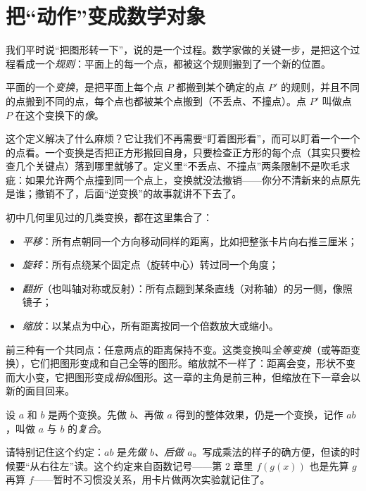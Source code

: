 \section{把“动作”变成数学对象}

我们平时说“把图形转一下”，说的是一个过程。数学家做的关键一步，是把这个过程看成一个\emph{规则}：平面上的每一个点，都被这个规则搬到了一个新的位置。

\begin{dingyi}[变换]
平面的一个\emph{变换}，是把平面上每个点 $P$ 都搬到某个确定的点 $P'$ 的规则，并且不同的点搬到不同的点，每个点也都被某个点搬到（不丢点、不撞点）。点 $P'$ 叫做点 $P$ 在这个变换下的\emph{像}。
\end{dingyi}

这个定义解决了什么麻烦？它让我们不再需要“盯着图形看”，而可以盯着一个一个的点看。一个变换是否把正方形搬回自身，只要检查正方形的每个点（其实只要检查几个关键点）落到哪里就够了。定义里“不丢点、不撞点”两条限制不是吹毛求疵：如果允许两个点撞到同一个点上，变换就没法撤销——你分不清新来的点原先是谁；撤销不了，后面“逆变换”的故事就讲不下去了。

初中几何里见过的几类变换，都在这里集合了：

\begin{itemize}
  \item \emph{平移}：所有点朝同一个方向移动同样的距离，比如把整张卡片向右推三厘米；
  \item \emph{旋转}：所有点绕某个固定点（旋转中心）转过同一个角度；
  \item \emph{翻折}（也叫轴对称或反射）：所有点翻到某条直线（对称轴）的另一侧，像照镜子；
  \item \emph{缩放}：以某点为中心，所有距离按同一个倍数放大或缩小。
\end{itemize}

前三种有一个共同点：任意两点的距离保持不变。这类变换叫\emph{全等变换}（或等距变换），它们把图形变成和自己全等的图形。缩放就不一样了：距离会变，形状不变而大小变，它把图形变成\emph{相似}图形。这一章的主角是前三种，但缩放在下一章会以新的面目回来。

\begin{dingyi}[复合]
设 $a$ 和 $b$ 是两个变换。先做 $b$、再做 $a$ 得到的整体效果，仍是一个变换，记作 $ab$，叫做 $a$ 与 $b$ 的\emph{复合}。
\end{dingyi}

请特别记住这个约定：$ab$ 是\emph{先做 $b$、后做 $a$}。写成乘法的样子的确方便，但读的时候要“从右往左”读。这个约定来自函数记号——第 2 章里 $f(g(x))$ 也是先算 $g$ 再算 $f$——暂时不习惯没关系，用卡片做两次实验就记住了。

